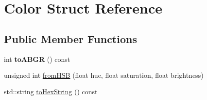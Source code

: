 \hypertarget{struct_color}{}\section{Color Struct Reference}
\label{struct_color}
\subsection*{Public Member Functions}
\begin{DoxyCompactItemize}
\item 
\mbox{\label{struct_color_a9d61c2714ef7e82af9497b1dd1406108}} 
int {\bfseries to\+A\+B\+GR} () const
\item 
unsigned int \mbox{\hyperlink{struct_color_abb4a64cd864c3db7b619fd72bcae18b3}{from\+H\+SB}} (float hue, float saturation, float brightness)
\item 
std\+::string \mbox{\hyperlink{struct_color_a15936d557edbfd6279f70fa274775255}{to\+Hex\+String}} () const
\end{DoxyCompactItemize}
